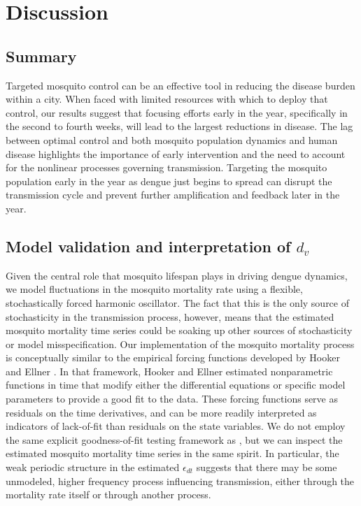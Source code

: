 \documentclass[10pt,letterpaper]{article}
\begin{document}
\section*{Discussion}


\subsection*{Summary}

Targeted mosquito control can be an effective tool in reducing the disease burden within a city.
When faced with limited resources with which to deploy that control, our results suggest that focusing efforts early in the year, specifically in the second to fourth weeks, will lead to the largest reductions in disease.
The lag between optimal control and both mosquito population dynamics and human disease highlights the importance of early intervention and the need to account for the nonlinear processes governing transmission.
Targeting the mosquito population early in the year as dengue just begins to spread can disrupt the transmission cycle and prevent further amplification and feedback later in the year.

\subsection*{Model validation and interpretation of $d_v$}

Given the central role that mosquito lifespan plays in driving dengue dynamics, we model fluctuations in the mosquito mortality rate using a flexible, stochastically forced harmonic oscillator.
The fact that this is the only source of stochasticity in the transmission process, however,  means that the estimated mosquito mortality time series could be soaking up other sources of stochasticity or model misspecification.
Our implementation of the mosquito mortality process is conceptually similar to the empirical forcing functions developed by Hooker and Ellner \cite{Hooker2015}.
In that framework, Hooker and Ellner \cite{Hooker2015} estimated nonparametric functions in time that modify either the differential equations or specific model parameters to provide a good fit to the data.
These forcing functions serve as residuals on the time derivatives, and can be more readily interpreted as indicators of lack-of-fit than residuals on the state variables.
We do not employ the same explicit goodness-of-fit testing framework as \cite{Hooker2015}, but we can inspect the estimated mosquito mortality time series in the same spirit.
In particular, the weak periodic structure in the estimated $\epsilon_{dt}$ suggests that there may be some unmodeled, higher frequency process influencing transmission, either through the mortality rate itself or through another process.
\end{document}
